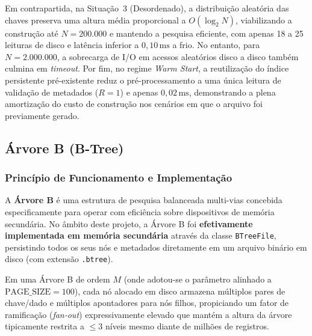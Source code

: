 \documentclass[12pt,a4paper]{article}
\begin{document}
Em contrapartida, na Situação~3 (Desordenado), a distribuição aleatória das chaves preserva uma altura média proporcional a $O(\log_2 N)$, viabilizando a construção até $N = 200.000$ e mantendo a pesquisa eficiente, com apenas 18 a 25 leituras de disco e latência inferior a $0{,}10\,\text{ms}$ a frio. No entanto, para $N = 2.000.000$, a sobrecarga de I/O em acessos aleatórios disco a disco também culmina em \textit{timeout}. Por fim, no regime \textit{Warm Start}, a reutilização do índice persistente pré-existente reduz o pré-processamento a uma única leitura de validação de metadados ($R = 1$) e apenas $0{,}02\,\text{ms}$, demonstrando a plena amortização do custo de construção nos cenários em que o arquivo foi previamente gerado.

\subsection{Árvore B (B-Tree)}
\label{subsec:btree}

\subsubsection{Princípio de Funcionamento e Implementação}
A \textbf{Árvore B} é uma estrutura de pesquisa balanceada multi-vias concebida especificamente para operar com eficiência sobre dispositivos de memória secundária. No âmbito deste projeto, a Árvore B foi \textbf{efetivamente implementada em memória secundária} através da classe \texttt{BTreeFile}, persistindo todos os seus nós e metadados diretamente em um arquivo binário em disco (com extensão \texttt{.btree}).

Em uma Árvore B de ordem $M$ (onde adotou-se o parâmetro alinhado a $\text{PAGE\_SIZE} = 100$), cada nó alocado em disco armazena múltiplos pares de chave/dado e múltiplos apontadores para nós filhos, propiciando um fator de ramificação (\textit{fan-out}) expressivamente elevado que mantém a altura da árvore tipicamente restrita a $\le 3$ níveis mesmo diante de milhões de registros.
\end{document}
